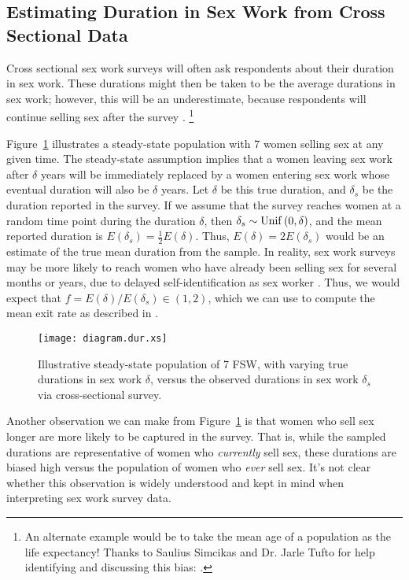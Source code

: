 \subsection{Estimating Duration in Sex Work from Cross Sectional Data}\label{app.model.math.dur}
Cross sectional sex work surveys will often ask respondents about their duration in sex work.
These durations might then be taken to be the average durations in sex work;
however, this will be an underestimate,
because respondents will continue selling sex after the survey \cite{Fazito2012}.%
\footnote{An alternate example would be
  to take the mean age of a population as the life expectancy!
  Thanks to Saulius Simcikas and Dr. Jarle Tufto
  for help identifying and discussing this bias:
  .}
\par
Figure~\ref{fig:diagram.dur.xs} illustrates a steady-state population
with 7 women selling sex at any given time.
The steady-state assumption implies that a women leaving sex work after $\delta$ years
will be immediately replaced by a women entering sex work
whose eventual duration will also be $\delta$ years.
Let $\delta$ be this true duration, and $\delta_s$ be the duration reported in the survey.
If we assume that the survey reaches women at a random time point during the duration $\delta$,
then $\delta_s \sim \operatorname{Unif}\,(0,\delta)$,
and the mean reported duration is $E(\delta_s) = \frac{1}{2}E(\delta)$.
Thus, $E(\delta) = 2 E(\delta_s)$ would be an estimate of the true mean duration from the sample.
In reality, sex work surveys may be more likely to reach
women who have already been selling sex for several months or years,
due to delayed self-identification as sex worker \cite{Cheuk2020}.
Thus, we would expect that $f = E(\delta) / E(\delta_s) \in (1,2)$,
which we can use to compute the mean exit rate as described in .
\begin{figure}[h]
  \centering
  \texttt{[image: diagram.dur.xs]}
  \caption{Illustrative steady-state population of 7 FSW,
    with varying true durations in sex work $\delta$,
    versus the observed durations in sex work $\delta_s$ via cross-sectional survey.}
  \label{fig:diagram.dur.xs}
\end{figure}
\par
Another observation we can make from Figure~\ref{fig:diagram.dur.xs} is that
women who sell sex longer are more likely to be captured in the survey.
That is, while the sampled durations are representative of women who \emph{currently} sell sex,
these durations are biased high versus the population of women who \emph{ever} sell sex.
It's not clear whether this observation is widely understood
and kept in mind when interpreting sex work survey data.
